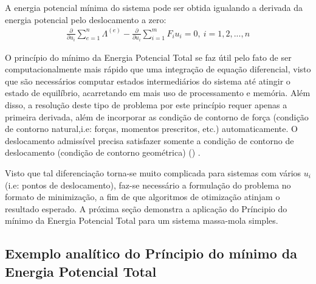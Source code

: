 \documentclass{article}
\begin{document}
A energia potencial mínima do sistema pode ser obtida igualando a derivada da energia potencial pelo deslocamento a zero:
\begin{equation}
\begin{split}
\frac{\partial}{\partial u_i} \sum_{e=1}^n \Lambda^{(e)} - \frac{\partial}{\partial u_i} \sum_{i=1}^{m} F_i u_i = 0,\ i=1,2, ..., n
\end{split}
\end{equation}


O princípio do mínimo da Energia Potencial Total se faz útil pelo fato de ser computacionalmente mais rápido que uma integração de equação diferencial, visto que são necessários computar estados intermediários do sistema até atingir o estado de equilíbrio, acarretando em mais uso de processamento e memória. Além disso, a resolução deste tipo de problema por este princípio requer apenas a primeira derivada, além de incorporar as condição de contorno de força (condição de contorno natural,i.e: forças, momentos prescritos, etc.) automaticamente. O deslocamento
admissível precisa satisfazer somente a condição de contorno de deslocamento (condição de contorno geométrica) (\cite{hill1959some}) . \newline

Visto que tal diferenciação torna-se muito complicada para sistemas com vários $u_i$ (i.e: pontos de deslocamento), faz-se necessário a formulação do problema no formato de minimização, a fim de que algoritmos de otimização atinjam o resultado esperado. A próxima seção demonstra a aplicação do Príncipio do mínimo da Energia Potencial Total para um sistema massa-mola simples.
\subsection{Exemplo analítico do Príncipio do mínimo da Energia Potencial Total}
\end{document}
